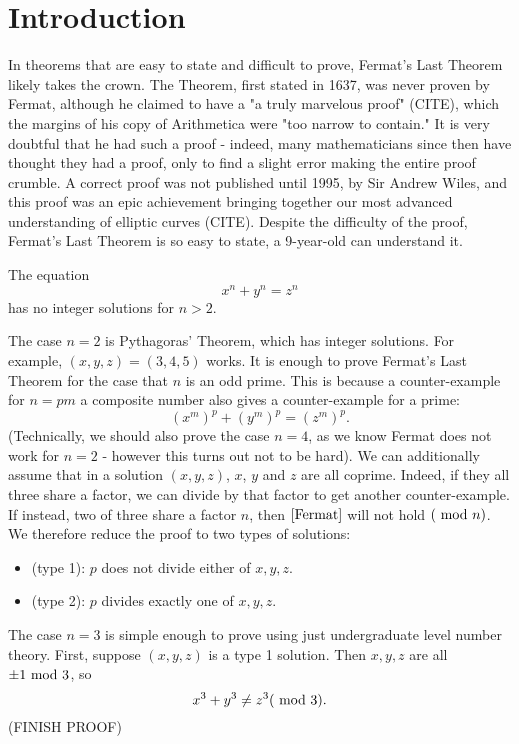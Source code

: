 \section{Introduction}
In theorems that are easy to state and difficult to prove, Fermat's Last Theorem likely takes the crown. The Theorem, first stated in 1637, was never proven by Fermat, although he claimed to have a "a truly marvelous proof" (CITE), which the margins of his copy of Arithmetica were "too narrow to contain." It is very doubtful that he had such a proof - indeed, many mathematicians since then have thought they had a proof, only to find a slight error making the entire proof crumble. A correct proof was not published until 1995, by Sir Andrew Wiles, and this proof was an epic achievement bringing together our most advanced understanding of elliptic curves (CITE). Despite the difficulty of the proof, Fermat's Last Theorem is so easy to state, a 9-year-old can understand it.

\begin{theorem}[Fermat]
The equation
\begin{equation}\label{Fermat}
    x^n+y^n=z^n
\end{equation}
has no integer solutions for $n>2$.
\end{theorem}

The case $n=2$ is Pythagoras' Theorem, which has integer solutions. For example, $(x,y,z)=(3,4,5)$ works. It is enough to prove Fermat's Last Theorem for the case that $n$ is an odd prime. This is because a counter-example for $n=pm$ a composite number also gives a counter-example for a prime:
$$(x^m)^p+(y^m)^p=(z^m)^p.$$
(Technically, we should also prove the case $n=4$, as we know Fermat does not work for $n=2$ - however this turns out not to be hard). We can additionally assume that in a solution $(x,y,z)$, $x$, $y$ and $z$ are all coprime. Indeed, if they all three share a factor, we can divide by that factor to get another counter-example. If instead, two of three share a factor $n$, then $\cref{Fermat}$ will not hold $(\ \mathrm{mod}\ n)$. We therefore reduce the proof to two types of solutions:
\begin{itemize}
    \item (type 1): $p$ does not divide either of $x,y,z$.
    \item (type 2): $p$ divides exactly one of $x,y,z$.
\end{itemize}

The case $n=3$ is simple enough to prove using just undergraduate level number theory. First, suppose $(x,y,z)$ is a type 1 solution. Then $x,y,z$ are all $\pm1 \ \mathrm{mod}\ 3$, so $$x^3+y^3\neq z^3 (\ \mathrm{mod}\ 3).$$
(FINISH PROOF)

